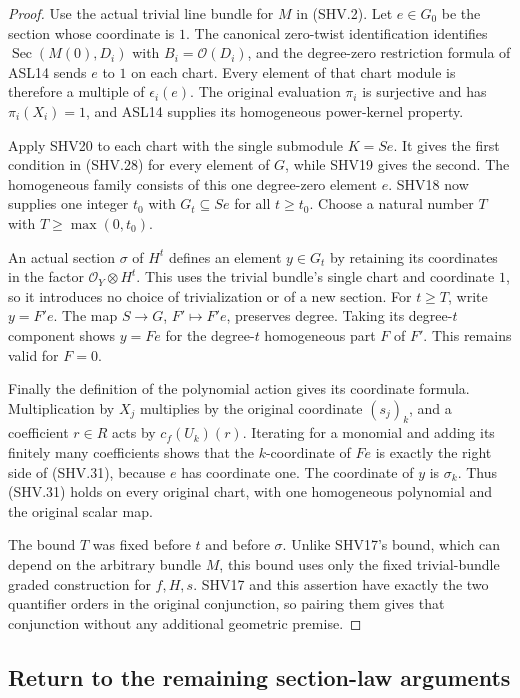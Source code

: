 \begin{proof}
Use the actual trivial line bundle for $M$ in (SHV.2).
Let $e\in G_0$ be the section whose coordinate is $1$.
The canonical zero-twist identification identifies
$\operatorname{Sec}(M(0),D_i)$ with $B_i=\mathcal O(D_i)$,
and the degree-zero restriction formula of ASL14 sends
$e$ to $1$ on each chart.  Every element of that chart
module is therefore a multiple of $\epsilon_i(e)$.
The original evaluation $\pi_i$ is surjective and has
$\pi_i(X_i)=1$, and ASL14 supplies its homogeneous
power-kernel property.

Apply SHV20 to each chart with the single submodule $K=S e$.
It gives the first condition in (SHV.28) for every element
of $G$, while SHV19 gives the second.  The homogeneous
family consists of this one degree-zero element $e$.
SHV18 now supplies one integer $t_0$ with $G_t\subseteq S e$
for all $t\ge t_0$.  Choose a natural number $T$ with
$T\ge\max(0,t_0)$.

An actual section $\sigma$ of $H^t$ defines an element
$y\in G_t$ by retaining its coordinates in the factor
$\mathcal O_Y\otimes H^t$.  This uses the trivial bundle's
single chart and coordinate $1$, so it introduces no choice
of trivialization or of a new section.
For $t\ge T$, write $y=F'e$.
The map $S\to G$, $F'\mapsto F'e$, preserves degree.
Taking its degree-$t$ component shows
$y=F e$ for the degree-$t$ homogeneous part $F$ of $F'$.
This remains valid for $F=0$.

Finally the definition of the polynomial action gives its
coordinate formula.  Multiplication by $X_j$ multiplies by
the original coordinate $(s_j)_k$, and a coefficient $r\in R$
acts by $c_f(U_k)(r)$.  Iterating for a monomial and adding
its finitely many coefficients shows that the $k$-coordinate
of $F e$ is exactly the right side of (SHV.31), because
$e$ has coordinate one.  The coordinate of $y$ is $\sigma_k$.
Thus (SHV.31) holds on every original chart, with one
homogeneous polynomial and the original scalar map.

The bound $T$ was fixed before $t$ and before $\sigma$.
Unlike SHV17's bound, which can depend on the arbitrary
bundle $M$, this bound uses only the fixed trivial-bundle
graded construction for $f,H,s$.
SHV17 and this assertion have exactly the two quantifier
orders in the original conjunction, so pairing them gives
that conjunction without any additional geometric premise.
\end{proof}

\subsection{Return to the remaining section-law arguments}

